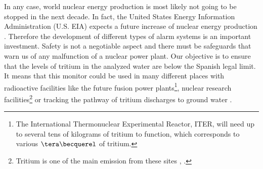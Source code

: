In any case, world nuclear energy production is most likely not going to be stopped in the next decade. In fact, the United States Energy Information Administration (U.S. EIA) expects a future increase of nuclear energy production \cite{EIAOutlook}. Therefore the development of  different types of alarm systems is an important investment. Safety is not a negotiable aspect and there must be safeguards that warn us of any malfunction of a nuclear power plant. Our objective is to ensure that the levels of tritium in the analyzed water are below the Spanish legal limit. It means that this monitor could be used in many different places with radioactive facilities like the future fusion power plants\footnote{The International Thermonuclear Experimental Reactor, ITER, will need up to several tens of kilograms of tritium to function, which corresponds to various $\tera\becquerel$ of tritium.}, nuclear research facilities\footnote{Tritium is one of the main emission from these sites \cite{FERMILAB}, \cite{BrookHavenNationalLaboratory}.} or tracking the pathway of tritium discharges to ground water \cite{TrackingTritium}. 

